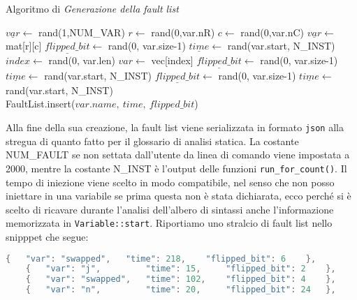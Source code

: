 \begin{algorithm}
    \caption{Algoritmo di \textit{Generazione della fault list}}
    \begin{algorithmic}
            \State $\underline{var} \gets$ rand(1,NUM\_VAR)
                \State $r \gets$ rand(0,var.nR) 
                \State $c \gets$ rand(0,var.nC) 
                \State $\underline{var} \gets$ mat[r][c]
                \State $\underline{flipped\_bit} \gets$ rand(0, var.size-1) 
                \State $\underline{time} \gets$ rand(var.start, N\_INST)
                \State $index \gets$ rand(0, var.len)
                \State $var \gets$ vec[index]
                \State $\underline{flipped\_bit} \gets$ rand(0, var.size-1) 
                \State $\underline{time} \gets$  rand(var.start, N\_INST) 
            \Else
                \State $\underline{flipped\_bit} \gets$ rand(0, var.size-1) 
                \State $\underline{time} \gets$  rand(var.start, N\_INST) 
            \EndIf \\
            FaultList.insert($var.name,\ time, \  flipped\_bit$) 
        \EndFor
    \end{algorithmic}
\end{algorithm}
Alla fine della sua creazione, la fault list viene serializzata in formato \texttt{json} alla stregua di quanto fatto per il glossario di analisi statica. La costante NUM\_FAULT se non settata dall'utente da linea di comando viene impostata a 2000, mentre la costante N\_INST è l'output delle funzioni \texttt{run\_for\_count()}. Il tempo di iniezione viene scelto in modo compatibile, nel senso che non posso iniettare in una variabile se prima questa non è stata dichiarata, ecco perché si è scelto di ricavare durante l'analisi dell'albero di sintassi anche l'informazione memorizzata in \texttt{Variable::start}. Riportiamo uno stralcio di fault list nello snipppet che segue:

\begin{lstlisting}[language=rust, style=boxed]
    {   "var": "swapped",   "time": 218,    "flipped_bit": 6    },
    {   "var": "j",         "time": 15,     "flipped_bit": 2    },
    {   "var": "swapped",   "time": 102,    "flipped_bit": 4    },
    {   "var": "n",         "time": 20,     "flipped_bit": 24   },
\end{lstlisting}

